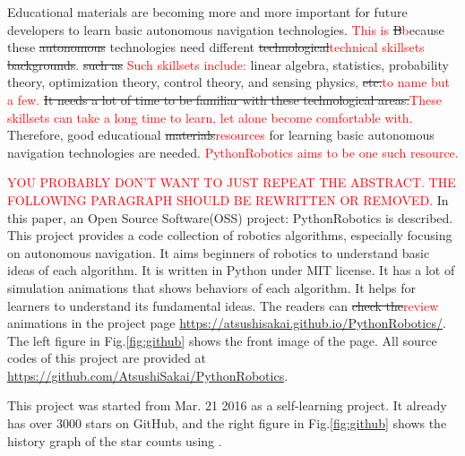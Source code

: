 \documentclass{bmvc2k}
\def\jwd{\textcolor{red}}
\begin{document}
Educational materials are becoming more and more important for future developers to learn basic autonomous navigation technologies.
\jwd{This is } \st{B}\jwd{b}ecause these \st{autonomous} technologies need different \st{technological}\jwd{technical skillsets} \st{backgrounds}\jwd{.} \st{such as} \jwd{Such skillsets include: }linear algebra, statistics, probability theory, optimization theory, control theory, and sensing physics\jwd{,} \st{etc.}\jwd{to name but a few.} 
\st{It needs a lot of time to be familiar with these technological areas.}\jwd{These skillsets can take a long time to learn, let alone become comfortable with.}
Therefore, good educational \st{materials}\jwd{resources} for learning basic autonomous navigation technologies are needed.  \jwd{PythonRobotics aims to be one such resource.}


\jwd{YOU PROBABLY DON'T WANT TO JUST REPEAT THE ABSTRACT.  THE FOLLOWING PARAGRAPH SHOULD BE REWRITTEN OR REMOVED.}
In this paper, an Open Source Software(OSS) project: PythonRobotics\cite{github} is described.
This project provides a code collection of robotics algorithms, especially focusing on autonomous navigation. 
It aims beginners of robotics to understand basic ideas of each algorithm.
It is written in Python\cite{python} under MIT license\cite{mit}.
It has a lot of simulation animations that shows behaviors of each algorithm.
It helps for learners to understand its fundamental ideas.
The readers can \st{check the}\jwd{review} animations in the project page \url{https://atsushisakai.github.io/PythonRobotics/}.
The left figure in Fig.\ref{fig:github} shows the front image of the page.
All source codes of this project are provided at \url{https://github.com/AtsushiSakai/PythonRobotics}.

This project was started from Mar. 21 2016 as a self-learning project.
It already has over 3000 stars on GitHub, and the right figure in Fig.\ref{fig:github} shows the history graph of the star counts using \cite{starhistory}.
\end{document}
